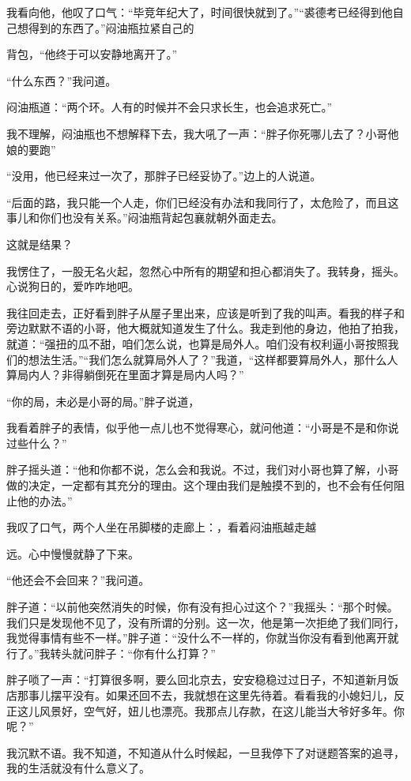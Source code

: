 我看向他，他叹了口气：“毕竞年纪大了，时间很快就到了。”“裘德考已经得到他自己想得到的东西了。”闷油瓶拉紧自己的

背包，“他终于可以安静地离开了。”

“什么东西？”我问道。

闷油瓶道：“两个环。人有的时候并不会只求长生，也会追求死亡。”

我不理解，闷油瓶也不想解释下去，我大吼了一声：“胖子你死哪儿去了？小哥他娘的要跑”

“没用，他已经来过一次了，那胖子已经妥协了。”边上的人说道。

“后面的路，我只能一个人走，你们已经没有办法和我同行了，太危险了，而且这事儿和你们也没有关系。”闷油瓶背起包襄就朝外面走去。

这就是结果？

我愣住了，一股无名火起，忽然心中所有的期望和担心都消失了。我转身，摇头。心说狗日的，爱咋咋地吧。

我往回走去，正好看到胖子从屋子里出来，应该是听到了我的叫声。看我的样子和旁边默默不语的小哥，他大概就知道发生了什么。我走到他的身边，他拍了拍我，就道：“强扭的瓜不甜，咱们怎么说，也算是局外人。咱们没有权利逼小哥按照我们的想法生活。”“我们怎么就算局外人了？”我道，“这样都要算局外人，那什么人算局内人？非得躺倒死在里面才算是局内人吗？”

“你的局，未必是小哥的局。”胖子说道，

我看着胖子的表情，似乎他一点儿也不觉得寒心，就问他道：“小哥是不是和你说过些什么？”

胖子摇头道：“他和你都不说，怎么会和我说。不过，我们对小哥也算了解，小哥做的决定，一定都有其充分的理由。这个理由我们是触摸不到的，也不会有任何阻止他的办法。”

我叹了口气，两个人坐在吊脚楼的走廊上：，看着闷油瓶越走越

远。心中慢慢就静了下来。

“他还会不会回来？”我问道。

胖子道：“以前他突然消失的时候，你有没有担心过这个？”我摇头：“那个时候。我们只是发现他不见了，没有所谓的分别。这一次，他是第一次拒绝了我们同行，我觉得事情有些不一样。”胖子道：“没什么不一样的，你就当你没有看到他离开就行了。”我转头就问胖子：“你有什么打算？”

胖子唢了一声：“打算很多啊，要么回北京去，安安稳稳过过日子，不知道新月饭店那事儿摆平没有。如果还回不去，我就想在这里先待着。看看我的小媳妇儿，反正这儿风景好，空气好，妞儿也漂亮。我那点儿存款，在这儿能当大爷好多年。你呢？”

我沉默不语。我不知道，不知道从什么时候起，一旦我停下了对谜题答案的追寻，我的生活就没有什么意义了。

